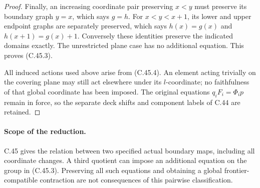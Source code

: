 \begin{proof}
Finally, an increasing
coordinate pair preserving
$x<y$ must preserve its
boundary graph $y=x$,
which says $g=h$.
For $x<y<x+1$, its lower
and upper endpoint graphs
are separately preserved,
which says
$h(x)=g(x)$ and
$h(x+1)=g(x)+1$.
Conversely these identities
preserve the indicated
domains exactly.
The unrestricted plane case
has no additional equation.
This proves (C.45.3).

All induced actions used
above arise from (C.45.4).
An element acting trivially
on the covering plane may
still act elsewhere under
its $l$-coordinate; no
faithfulness of that global
coordinate has been imposed.
The original equations
$q_iF_i=\Phi_i p$ remain
in force, so the separate
deck shifts and component
labels of C.44 are retained.
\end{proof}

\paragraph{Scope of the reduction.}
C.45 gives the relation between
two specified actual boundary
maps, including all coordinate
changes. A third quotient can
impose an additional equation
on the group in (C.45.3).
Preserving all such equations
and obtaining a global
frontier-compatible contraction
are not consequences of this
pairwise classification.
